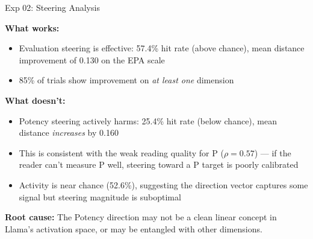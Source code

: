 \documentclass[aspectratio=169,11pt]{beamer}
\begin{document}
\begin{frame}{Exp 02: Steering Analysis}

\textbf{What works:}
\begin{itemize}
    \item \textcolor{AccentGreen}{Evaluation steering is effective}:
          57.4\% hit rate (above chance), mean distance improvement of
          0.130 on the EPA scale
    \item 85\% of trials show improvement on \emph{at least one} dimension
\end{itemize}

\bigskip

\textbf{What doesn't:}
\begin{itemize}
    \item \textcolor{AccentRed}{Potency steering actively harms}:
          25.4\% hit rate (below chance), mean distance \emph{increases}
          by 0.160
    \item This is consistent with the weak reading quality for P
          ($\rho = 0.57$) --- if the reader can't measure P well,
          steering toward a P target is poorly calibrated
    \item Activity is near chance (52.6\%), suggesting the direction
          vector captures some signal but steering magnitude is
          suboptimal
\end{itemize}

\bigskip

\textbf{Root cause:} The Potency direction may not be a clean linear
concept in Llama's activation space, or may be entangled with other
dimensions.
\end{frame}
\end{document}
